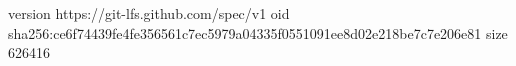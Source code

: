 version https://git-lfs.github.com/spec/v1
oid sha256:ce6f74439fe4fe356561c7ec5979a04335f0551091ee8d02e218be7c7e206e81
size 626416
